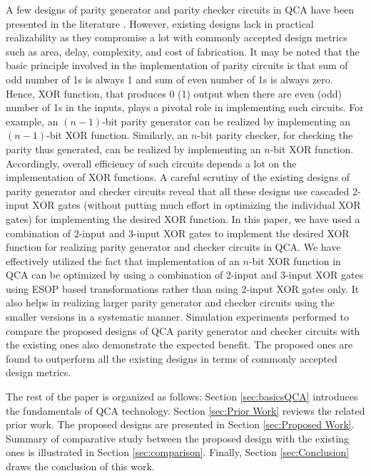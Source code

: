 \documentclass[conference]{IEEEtran}
\begin{document}
A few designs of parity generator and parity checker circuits in QCA have been presented in the literature \cite{Das_FITEE_2016,firdous_2015,firdous_bhat2014,teja_nems2008,S_utpal2014,beigh_ijpap2013}. 
However, existing designs lack in practical realizability as they compromise a lot with commonly accepted design metrics such as area, delay, complexity, and cost of fabrication.
It may be noted that the basic principle involved in the implementation of parity circuits is that sum of odd number of 1s is always 1 and sum of even number of 1s is always zero.
Hence, XOR function, that produces 0 (1) output when there are even (odd) number of 1s in the inputs, plays a pivotal role in implementing such circuits.
For example, an $(n-1)$-bit parity generator can be realized by implementing an $(n-1)$-bit XOR function.
Similarly, an $n$-bit parity checker, for checking the parity thus generated, can be realized by implementing an $n$-bit XOR function.
Accordingly, overall efficiency of such circuits depends a lot on the implementation of XOR functions.  
A careful scrutiny of the existing designs of parity generator and checker circuits reveal that all these designs use cascaded 2-input XOR gates (without putting much effort in optimizing the individual XOR gates) for implementing the desired XOR function.
In this paper, we have used a combination of 2-input and 3-input XOR gates to implement the desired XOR function for realizing parity generator and checker circuits in QCA.
We have effectively utilized the fact that implementation of an $n$-bit XOR function in QCA can be optimized by using a combination of 2-input and 3-input XOR gates using ESOP based transformations \cite{Feinstein_RMW2007} rather than using 2-input XOR gates only.
It also helps in realizing larger parity generator and checker circuits using the smaller versions in a systematic manner. 
Simulation experiments performed to compare the proposed designs of QCA parity generator and checker circuits with the existing ones also demonstrate the expected benefit.
The proposed ones are found to outperform all the existing designs in terms of commonly accepted design metrics.  

The rest of the paper is organized as follows: 
Section \ref{sec:basicsQCA} introduces the fundamentals of QCA technology.
Section \ref{sec:Prior Work} reviews the related prior work.
The proposed designs are presented in Section \ref{sec:Proposed Work}.
Summary of comparative study between the proposed design with the existing ones is illustrated in Section \ref{sec:comparison}.
Finally, Section \ref{sec:Conclusion} draws the conclusion of this work. 
\end{document}
